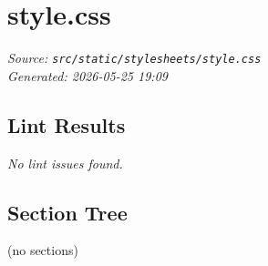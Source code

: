 
\section{style.css}
\textit{Source: \texttt{src/static/stylesheets/style.css}} \\
\textit{Generated: 2026-05-25 19:09} \\

\subsection{Lint Results}
\textit{No lint issues found.} \\

\subsection{Section Tree}
\begingroup
\linespread{0.9}\selectfont
\begin{verbnobox}[\FiraCode]
(no sections)
\end{verbnobox}
\endgroup
